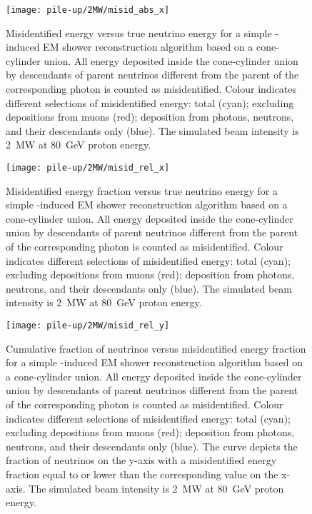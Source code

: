 \begin{figure}[htb]
	\centering
	\texttt{[image: pile-up/2MW/misid\_abs\_x]}
	\caption{Misidentified energy versus true neutrino energy for a simple \Pgpz-induced EM shower reconstruction algorithm based on a cone-cylinder union.
		All energy deposited inside the cone-cylinder union by descendants of parent neutrinos different from the parent of the corresponding \Pgpz photon is counted as misidentified.
		Colour indicates different selections of misidentified energy: total (cyan); excluding depositions from muons (red); deposition from photons, neutrons, and their descendants only (blue).
		The simulated beam intensity is \SI{2}{\mega\watt} at \SI{80}{\giga\electronvolt} proton energy.}
	\label{fig:dune-nd_2MW_misid-abs-x}
\end{figure}

\begin{figure}[htb]
	\centering
	\texttt{[image: pile-up/2MW/misid\_rel\_x]}
	\caption{Misidentified energy fraction versus true neutrino energy for a simple \Pgpz-induced EM shower reconstruction algorithm based on a cone-cylinder union.
		All energy deposited inside the cone-cylinder union by descendants of parent neutrinos different from the parent of the corresponding \Pgpz photon is counted as misidentified.
		Colour indicates different selections of misidentified energy: total (cyan); excluding depositions from muons (red); deposition from photons, neutrons, and their descendants only (blue).
		The simulated beam intensity is \SI{2}{\mega\watt} at \SI{80}{\giga\electronvolt} proton energy.}
	\label{fig:dune-nd_2MW_misid-rel-x}
\end{figure}

\begin{figure}[htb]
	\centering
	\texttt{[image: pile-up/2MW/misid\_rel\_y]}
	\caption{Cumulative fraction of neutrinos versus misidentified energy fraction for a simple \Pgpz-induced EM shower reconstruction algorithm based on a cone-cylinder union.
		All energy deposited inside the cone-cylinder union by descendants of parent neutrinos different from the parent of the corresponding \Pgpz photon is counted as misidentified.
		Colour indicates different selections of misidentified energy: total (cyan); excluding depositions from muons (red); deposition from photons, neutrons, and their descendants only (blue).
		The curve depicts the fraction of neutrinos on the y-axis with a misidentified energy fraction equal to or lower than the corresponding value on the x-axis.
		The simulated beam intensity is \SI{2}{\mega\watt} at \SI{80}{\giga\electronvolt} proton energy.}
	\label{fig:dune-nd_2MW_misid-rel-y}
\end{figure}

